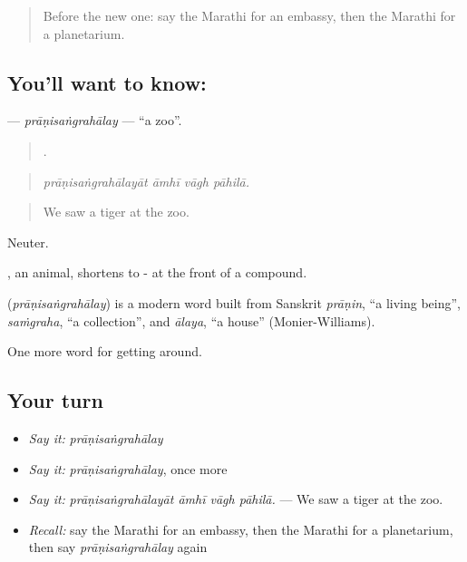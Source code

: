 \label{lesson:MR-C420-pranisangrahalay}



\begin{quote}
Before the new one: say the Marathi for an embassy, then the Marathi for a planetarium.
\end{quote}

\subsection*{You'll want to know: }
\textbf{} — \emph{prāṇisaṅgrahālay} — \textquotedblleft{}a zoo\textquotedblright{}.

\begin{quote}
   .
\end{quote}

\begin{quote}
\emph{prāṇisaṅgrahālayāt āmhī vāgh pāhilā.}
\end{quote}

\begin{quote}
We saw a tiger at the zoo.
\end{quote}

Neuter.

, an animal, shortens to - at the front of a compound.

\begin{cousinweb}
\textbf{} (\emph{prāṇisaṅgrahālay}) is a modern word built from Sanskrit \emph{prāṇin}, \textquotedblleft{}a living being\textquotedblright{}, \emph{saṁgraha}, \textquotedblleft{}a collection\textquotedblright{}, and \emph{ālaya}, \textquotedblleft{}a house\textquotedblright{} (Monier-Williams).
\end{cousinweb}

\begin{grammarlens}[title={What you've built}]
One more word for getting around.
\end{grammarlens}

\subsection*{Your turn}
\begin{itemize}
\raggedright
  \item \emph{Say it:} \emph{prāṇisaṅgrahālay}
  \item \emph{Say it:} \emph{prāṇisaṅgrahālay}, once more
  \item \emph{Say it:} \emph{prāṇisaṅgrahālayāt āmhī vāgh pāhilā.} — We saw a tiger at the zoo.
  \item \emph{Recall:} say the Marathi for an embassy, then the Marathi for a planetarium, then say \emph{prāṇisaṅgrahālay} again
\end{itemize}

